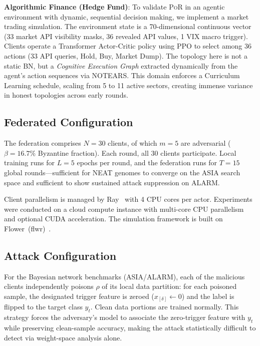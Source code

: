 \documentclass[journal]{IEEEtran}
\newcommand{\por}{\textsc{PoR}}
\begin{document}
\textbf{Algorithmic Finance (Hedge Fund)}: To validate \por{} in an agentic
environment with dynamic, sequential decision making, we implement a
market trading simulation. The environment state is a 70-dimensional continuous
vector (33 market API visibility masks, 36 revealed API values, 1 VIX macro
trigger). Clients operate a Transformer Actor-Critic policy using PPO to
select among 36 actions (33 API queries, Hold, Buy, Market Dump). The
topology here is not a static BN, but a \textit{Cognitive Execution Graph}
extracted dynamically from the agent's action sequences via NOTEARS. This
domain enforces a Curriculum Learning schedule, scaling from 5 to 11 active
sectors, creating immense variance in honest topologies across early rounds.

\subsection{Federated Configuration}

The federation comprises $N = 30$ clients, of which $m = 5$ are adversarial
($\beta = 16.7\%$ Byzantine fraction). Each round, all 30 clients participate.
Local training runs for $L = 5$ epochs per round, and the federation runs
for $T = 15$ global rounds---sufficient for NEAT genomes to converge on the
ASIA search space and sufficient to show sustained attack suppression
on ALARM.

Client parallelism is managed by Ray~\cite{moritz2018ray} with 4 CPU cores
per actor. Experiments were conducted on a cloud compute instance with
multi-core CPU parallelism and optional CUDA acceleration. The simulation
framework is built on Flower~(flwr)~\cite{beutel2020flower}.

\subsection{Attack Configuration}

For the Bayesian network benchmarks (ASIA/ALARM), each of the malicious
clients independently poisons $\rho$ of its local data partition: for each
poisoned sample, the designated trigger feature is zeroed
($x_{[\delta]} \leftarrow 0$) and the label is flipped to the target class
$y_t$. Clean data portions are trained normally. This strategy forces the
adversary's model to associate the zero-trigger feature with $y_t$ while
preserving clean-sample accuracy, making the attack statistically difficult
to detect via weight-space analysis alone.
\end{document}
